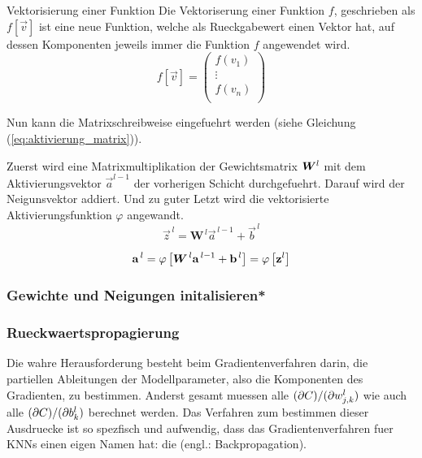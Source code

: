 \documentclass[../main]{subfiles}
\begin{document}
\begin{defbox}{Vektorisierung einer Funktion}
  Die Vektoriserung einer Funktion $f$, geschrieben als $f[\vec{v}]$ ist eine
  neue Funktion, welche als Rueckgabewert einen Vektor hat, auf dessen
  Komponenten jeweils immer die Funktion $f$ angewendet wird.
  \begin{equation*}
    f[\vec{v}]=
    \begin{pmatrix}
      f(v_1)\\
      \vdots \\
      f(v_n)\\
    \end{pmatrix}
  \end{equation*}
\end{defbox}

\para{}

Nun kann die Matrixschreibweise eingefuehrt werden (siehe Gleichung (\ref{eq:aktivierung_matrix})).\par
Zuerst wird eine Matrixmultiplikation der Gewichtsmatrix $\bm{W}^l$ mit dem
Aktivierungsvektor $\vec{a}^{l-1}$ der vorherigen Schicht durchgefuehrt. Darauf
wird der Neigunsvektor addiert. Und zu guter Letzt wird die vektorisierte
Aktivierungsfunktion $\varphi$ angewandt.
\begin{equation}\label{eq:aktivierung_matrix}
  \vec{z}^{\,l} = \mathbf{W}^{\,l} \vec{a}^{\,l-1} + \vec{b}^{\,l}
\end{equation}
\par
\begin{equation}\label{eq:aktivierung_matrix}
  \mathbf{a}^{\,l} = \varphi \left[\bm{W}^{\,l} \mathbf{a}^{\,l-1} + \mathbf{b}^{\,l} \right] = \varphi \left[ \mathbf{z}^l \right]
\end{equation}


\subsubsection{Gewichte und Neigungen initalisieren*}

\subsubsection{Rueckwaertspropagierung}\label{sec:backpropagation}
Die wahre Herausforderung besteht beim Gradientenverfahren darin,
die partiellen Ableitungen der Modellparameter,
also die Komponenten des Gradienten, zu bestimmen.
Anderst gesamt muessen alle
$(\partial C)/(\partial w_{j,k}^l)$ wie auch alle $(\partial C)/(\partial b_k^l)$
berechnet werden.
Das Verfahren zum bestimmen dieser Ausdruecke ist so spezfisch und aufwendig,
dass das Gradientenverfahren fuer KNNs einen eigen Namen hat: die
 (engl.: Backpropagation).
\end{document}

